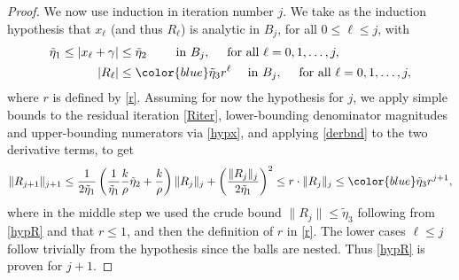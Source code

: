 \documentclass[10pt]{article}
\newcommand{\g}{\gamma}
\newcommand{\te}{\tilde\eta}
\newcommand{\Fruzsi}[1]{{\color{blue}#1}}
\begin{document}
\begin{proof}
  We now use induction in iteration number $j$.
    We take as the induction hypothesis that $x_\ell$ (and thus $R_\ell$)
  is analytic in $B_j$, for all $0\le \ell \le j$, with
  \Fruzsi{
  \begin{align}
      \te_1 \leq |x_\ell + \g| &\leq \te_2
  \qquad \mbox{ in } B_j, \quad \mbox{ for all } \ell = 0,1,\dots,j,
  \label{hypx} \\
      |R_\ell| &\leq \Fruzsi{\te_3} r^\ell \quad \mbox{ in } B_j, \quad \mbox{ for all } \ell = 0,1,\dots,j,
  \label{hypR}
  \end{align}
  }
  where $r$ is defined by \cref{r}.
  Assuming for now the hypothesis for $j$, we apply simple bounds to the
  residual iteration \cref{Riter},
  lower-bounding denominator magnitudes and upper-bounding numerators
  via \cref{hypx},
  and applying \cref{derbnd} to the two derivative terms, to get
  $$
  \|R_{j+1}\|_{j+1}
  \leq
  \frac{1}{2\te_1}\left(
  \frac{1}{\te_1} \frac{k}{\rho}\te_2 + \frac{k}{\rho}
  \right)\|R_j\|_j
  +\biggl(\frac{\|R_j\|_j}{2\te_1}\biggr)^2
  \leq
  r \cdot \|R_j\|_j
  \leq
  \Fruzsi{\te_3} r^{j+1},
  $$
where in the middle step we used the crude bound $\|R_j\| \le \te_3$
following from \cref{hypR} and that $r\le1$, and then the definition of $r$ in \cref{r}.
The lower cases $\ell\le j$ follow trivially from the hypothesis since the balls
are nested.
Thus \cref{hypR} is proven for $j+1$.


\end{proof}
\end{document}
